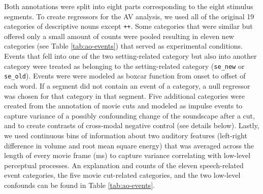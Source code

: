 \documentclass[english]{article}
\begin{document}
Both annotations were split into eight parts corresponding to the eight stimulus
segments.
To create regressors for the AV analysis, we used all of the original 19
categories of descriptive nouns except \texttt{++}.
Some categories that were similar but offered only a small amount of counts were
pooled resulting in eleven new categories (see Table \ref{tab:ao-events}) that
served as experimental conditions.
Events that fell into one of the two setting-related category but also into
another category were treated as belonging to the setting-related category
(\texttt{se\_new} or \texttt{se\_old}).
Events were were modeled as boxcar function from onset to offset of each word.
If a segment did not contain an event of a category, a null regressor was chosen
for that category in that segment.
Five additional categories were created from the annotation of movie cuts and
modeled as impulse events to capture variance of a possibly confounding change
of the soundscape after a cut, and to create contrasts of cross-modal negative
control (see details below).
Lastly, we used continuous bins of information about two auditory features
(left-right difference in volume and root mean square energy) that was averaged
across the length of every movie frame (\unit[40]{ms}) to capture variance
correlating with low-level perceptual processes.
An explanation and counts of the eleven speech-related event categories, the
five movie cut-related categories, and the two low-level confounds can be found
in Table \ref{tab:ao-events}.
\end{document}
